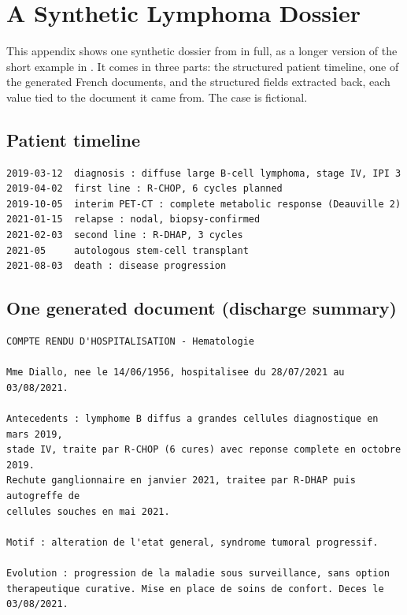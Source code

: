 \chapter{A Synthetic Lymphoma Dossier}
\label{app:lymphoma-dossier}

This appendix shows one synthetic dossier from  in
full, as a longer version of the short example in . It
comes in three parts: the structured patient timeline, one of the generated
French documents, and the structured fields extracted back, each value tied to
the document it came from. The case is fictional.

\section{Patient timeline}

\begin{lstlisting}[style=thesisprompt]
2019-03-12  diagnosis : diffuse large B-cell lymphoma, stage IV, IPI 3
2019-04-02  first line : R-CHOP, 6 cycles planned
2019-10-05  interim PET-CT : complete metabolic response (Deauville 2)
2021-01-15  relapse : nodal, biopsy-confirmed
2021-02-03  second line : R-DHAP, 3 cycles
2021-05     autologous stem-cell transplant
2021-08-03  death : disease progression
\end{lstlisting}

\section{One generated document (discharge summary)}

\begin{lstlisting}[style=thesisprompt]
COMPTE RENDU D'HOSPITALISATION - Hematologie

Mme Diallo, nee le 14/06/1956, hospitalisee du 28/07/2021 au 03/08/2021.

Antecedents : lymphome B diffus a grandes cellules diagnostique en mars 2019,
stade IV, traite par R-CHOP (6 cures) avec reponse complete en octobre 2019.
Rechute ganglionnaire en janvier 2021, traitee par R-DHAP puis autogreffe de
cellules souches en mai 2021.

Motif : alteration de l'etat general, syndrome tumoral progressif.

Evolution : progression de la maladie sous surveillance, sans option
therapeutique curative. Mise en place de soins de confort. Deces le 03/08/2021.
\end{lstlisting}

